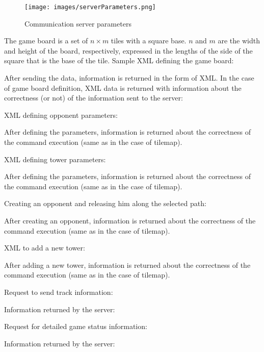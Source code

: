 \begin{figure}
\texttt{[image: images/serverParameters.png]}
\caption{Communication server parameters}
\label{Fig:serverParameters}
\end{figure} 

The game board is a set of $n \times m$ tiles with a square base. $n$ and $m$ are the width and height of the board, respectively, expressed in the lengths of the side of the square that is the base of the tile. Sample XML defining the game board:


After sending the data, information is returned in the form of XML. In the case of game board definition, XML data is returned with information about the correctness (or not) of the information sent to the server:


XML defining opponent parameters:


After defining the parameters, information is returned about the correctness of the command execution (same as in the case of tilemap).

XML defining tower parameters:


After defining the parameters, information is returned about the correctness of the command execution (same as in the case of tilemap).

Creating an opponent and releasing him along the selected path:


After creating an opponent, information is returned about the correctness of the command execution (same as in the case of tilemap).

XML to add a new tower:


After adding a new tower, information is returned about the correctness of the command execution (same as in the case of tilemap).

Request to send track information:


Information returned by the server:


Request for detailed game status information:


Information returned by the server:
